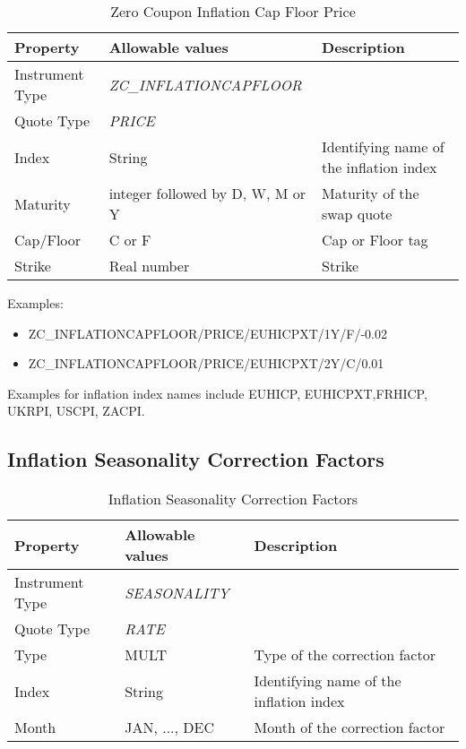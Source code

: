\begin{table}[H]
    \centering
    \begin{tabular}{|p{3cm}|p{3.5cm}|p{7cm}|}
      \hline
      {\bf Property} & {\bf Allowable values} & {\bf Description} \\ \hline
      Instrument Type & \emph{ZC\_INFLATIONCAPFLOOR} & \\ \hline
      Quote Type & \emph{PRICE} & \\ \hline
      Index & String & Identifying name of the inflation index \\ \hline
      Maturity & integer followed by D, W, M or Y & Maturity of the swap quote \\ \hline
      Cap/Floor & C or F & Cap or Floor tag \\ \hline
      Strike & Real number & Strike \\ \hline
    \end{tabular}
    \caption{Zero Coupon Inflation Cap Floor Price}
    \label{tab:zcinflationcapfloorprice_quote}
\end{table}

\medskip
Examples:
\begin{itemize}
\item {ZC\_INFLATIONCAPFLOOR/PRICE/EUHICPXT/1Y/F/-0.02}
\item {ZC\_INFLATIONCAPFLOOR/PRICE/EUHICPXT/2Y/C/0.01}
\end{itemize}

Examples for inflation index names include EUHICP, EUHICPXT,FRHICP, UKRPI, USCPI, ZACPI.

\subsection{Inflation Seasonality Correction Factors}

\begin{table}[H]
    \centering
    \begin{tabular}{|p{3cm}|p{3.5cm}|p{7cm}|}
      \hline
      {\bf Property} & {\bf Allowable values} & {\bf Description} \\ \hline
      Instrument Type & \emph{SEASONALITY} & \\ \hline
      Quote Type & \emph{RATE} & \\ \hline
      Type & MULT & Type of the correction factor \\ \hline
      Index & String & Identifying name of the inflation index \\ \hline
      Month & JAN, ..., DEC & Month of the correction factor \\ \hline
    \end{tabular}
    \caption{Inflation Seasonality Correction Factors}
    \label{tab:inflationseasonality_quote}
\end{table}

